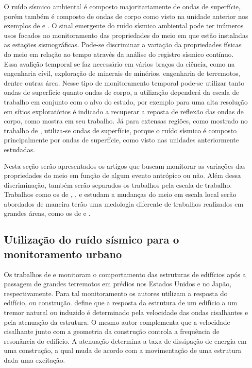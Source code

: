 \documentclass[paper,twocolumn]{geophysics}
\begin{document}
O ruído sísmico ambiental é composto majoritariamente de ondas de superfície, porém também é composto de ondas de corpo como visto na unidade anterior nos exemplos de \cite{roux_p-waves_2005} e \cite{poli_emergence_2012}. O sinal emergente do ruído sísmico ambiental pode ter inúmeros usos focados no monitoramento das propriedades do meio em que estão instaladas as estações sismográficas.  Pode-se discriminar a variação da propriedades físicas do meio em relação ao tempo através da análise do registro sísmico contínuo. Essa avalição temporal se faz necessário em vários braços da ciência, como na engenharia cívil, exploração de minerais de minérios, engenharia de terremotos, dentre outras área. Nesse tipo de monitoramento temporal pode-se utilizar tanto ondas de superfície quanto ondas de corpo, a utilização dependerá da escala de trabalho em conjunto com o alvo do estudo, por exemplo para uma alta resolução em sítios exploratórios é indicado a recuperar a reposta de reflexão das ondas de corpo, como mostra \cite{boullenger_studying_2015} em seu trabalho. Já para extensas regiões, como mostrado no trabalho de \cite{zaccarelli_variations_2011}, utiliza-se ondas de superfície, porque o ruído sísmico é composto principalmente por ondas de superfície, como visto nas unidades anteriormente estudadas.

Nesta seção serão apresentados os artigos que buscam monitorar as variações das propriedades do meio em função de algum evento antrópico ou não. Além dessa discriminação, também serão separados os trabalhos pela escala de trabalho. Trabalhos como os de \cite{prieto_impulse_2010}, \cite{vidal_retrieval_2014}, \cite{boullenger_studying_2015} e \cite{nakata_damage_2015} estudam a mudanças do meio em escala local serão abordados de maneira terão uma medologia diferente de trabalhos realizados em grandes áreas, como os de \cite{li_seismic_2006} e \cite{zaccarelli_variations_2011}.

\subsection*{Utilização do ruído sísmico para o monitoramento urbano}

Os trabalhos de \cite{prieto_impulse_2010} e \cite{nakata_damage_2015} monitoram o comportamento das estruturas de edifícios após a passagem de grandes terremotos em prédios nos Estados Unidos e no Japão, respectivamente. Para tal monitoramento os autores utilizam a resposta do edifício, ou construção. \cite{snieder_extracting_2006} define que a resposta da estrutura de um edifício a um tremor natural ou induzido é determinado pela velocidade das ondas cisalhantes e pela atenuação da estrutura. O mesmo autor complementa que a velocidade cisalhante junto com a geometria da construção controla a frequência de resonância do edifício. A atenuação determina a taxa de dissipação de energia em uma construção, a qual muda de acordo com a movimentação de uma estrutura dada uma excitação. 
\end{document}
